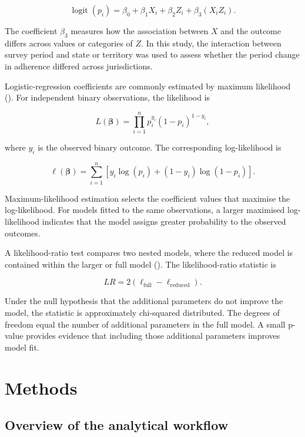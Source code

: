 \documentclass[
  12pt,
  a4paper,
]{article}
\begin{document}
\[
\operatorname{logit}(p_i)
=
\beta_0
+
\beta_1X_i
+
\beta_2Z_i
+
\beta_3(X_iZ_i).
\]

The coefficient \(\beta_3\) measures how the association between \(X\) and
the outcome differs across values or categories of \(Z\). In this study,
the interaction between survey period and state or territory was used to
assess whether the period change in adherence differed across
jurisdictions.

Logistic-regression coefficients are commonly estimated by maximum
likelihood (). For independent binary observations, the
likelihood is

\[
L(\boldsymbol{\beta})
=
\prod_{i=1}^{n}
p_i^{y_i}
(1-p_i)^{1-y_i},
\]

where \(y_i\) is the observed binary outcome. The corresponding
log-likelihood is

\[
\ell(\boldsymbol{\beta})
=
\sum_{i=1}^{n}
\left[
y_i\log(p_i)
+
(1-y_i)\log(1-p_i)
\right].
\]

Maximum-likelihood estimation selects the coefficient values that
maximise the log-likelihood. For models fitted to the same observations,
a larger maximised log-likelihood indicates that the model assigns
greater probability to the observed outcomes.

A likelihood-ratio test compares two nested models, where the reduced
model is contained within the larger or full model (). The
likelihood-ratio statistic is

\[
LR
=
2\left(
\ell_{\text{full}}
-
\ell_{\text{reduced}}
\right).
\]

Under the null hypothesis that the additional parameters do not improve
the model, the statistic is approximately chi-squared distributed. The
degrees of freedom equal the number of additional parameters in the full
model. A small p-value provides evidence that including those additional
parameters improves model fit.

\section{Methods}\label{methods}

\subsection{Overview of the analytical workflow}\label{overview-of-the-analytical-workflow}
\end{document}
